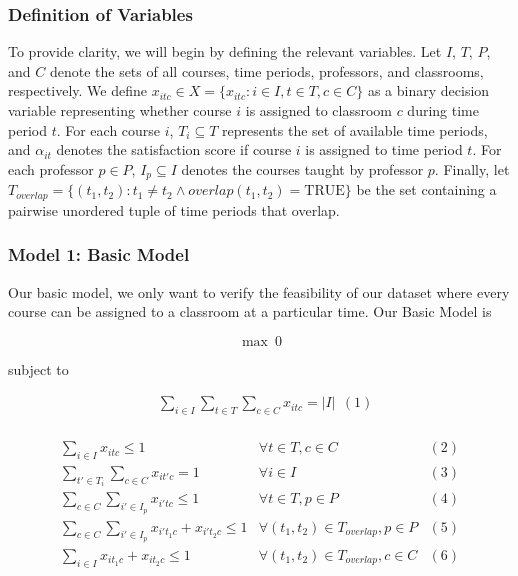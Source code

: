 \documentclass{article}
\begin{document}
\subsubsection{Definition of Variables}

To provide clarity, we will begin by defining the relevant variables. Let $I$, $T$, $P$, and $C$ denote the sets of all courses, time periods, professors, and classrooms, respectively. We define $x_{itc} \in X = \{x_{itc}: i \in I, t \in T, c \in C\}$ as a binary decision variable representing whether course $i$ is assigned to classroom $c$ during time period $t$. For each course $i$, $T_i \subseteq T$ represents the set of available time periods, and $\alpha_{it}$ denotes the satisfaction score if course $i$ is assigned to time period $t$. For each professor $p \in P$, $I_p \subseteq I$ denotes the courses taught by professor $p$. Finally, let $T_{overlap} = \{(t_1, t_2): t_1 \neq t_2 \wedge overlap(t_1, t_2) = \text{TRUE}\}$ be the set containing a pairwise unordered tuple of time periods that overlap.

\subsubsection{Model 1: Basic Model}

Our basic model, we only want to verify the feasibility of our dataset where every course can be assigned to a classroom at a particular time. Our Basic Model is 

$$
\max \ 0
$$

subject to

$$
\begin{aligned}
  & \sum_{i \in I} \sum_{t \in T} \sum_{c \in C} x_{i t c}=|I| \ \ (1) \\
\end{aligned}
$$

$$
\begin{array}{lll}
\sum_{i \in I} x_{i t c} \leq 1 & \forall t \in T, c \in C & (2)\\
\sum_{t' \in T_i} \sum_{c \in C} x_{i t' c}=1 & \forall i \in I & (3)\\
\sum_{c \in C} \sum_{i' \in I_p} x_{i' t c} \leq 1 & \forall t \in T, p \in P & (4)\\
\sum_{c \in C} \sum_{i' \in I_p} x_{i' t_1 c} + x_{i' t_2 c} \leq 1 & \forall (t_1, t_2) \in T_{overlap}, p \in P & (5)\\
\sum_{i \in I} x_{i t_1 c} + x_{i t_2 c} \leq 1 & \forall (t_1, t_2) \in T_{overlap}, c \in C & (6)\\
\end{array}
$$
\end{document}
